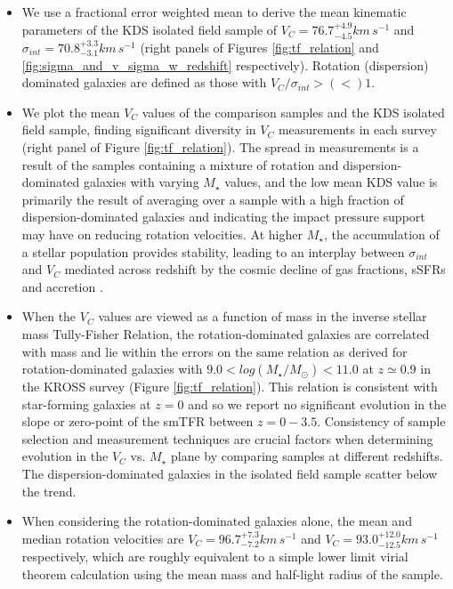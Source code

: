 \documentclass[fleqn,usenatbib]{mnras}
\begin{document}
\begin{itemize}
    \item We use a fractional error weighted mean to derive the mean kinematic parameters of the KDS isolated field sample of $V_{C} = 76.7^{+4.9}_{-4.5}km\,s^{-1}$ and $\sigma_{int} = 70.8^{+3.3}_{-3.1} km\,s^{-1}$ (right panels of Figures \ref{fig:tf_relation} and \ref{fig:sigma_and_v_sigma_w_redshift} respectively).
    Rotation (dispersion) dominated galaxies are defined as those with $V_{C}/\sigma_{int} > (<) 1$.  
    \item We plot the mean $V_{C}$ values of the comparison samples and the KDS isolated field sample, finding significant diversity in $V_{C}$ measurements in each survey (right panel of Figure \ref{fig:tf_relation}).
    The spread in measurements is a result of the samples containing a mixture of rotation and dispersion-dominated galaxies with varying $M_{\star}$ values, and the low mean KDS value is primarily the result of averaging over a sample with a high fraction of dispersion-dominated galaxies and indicating the impact pressure support may have on reducing rotation velocities.
    At higher $M_{\star}$, the accumulation of a stellar population provides stability, leading to an interplay between $\sigma_{int}$ and $V_{C}$ mediated across redshift by the cosmic decline of gas fractions, sSFRs and accretion \citep[e.g.][]{Law2012b,Wisnioski2015}.
    \item When the $V_{C}$ values are viewed as a function of mass in the inverse stellar mass Tully-Fisher Relation, the rotation-dominated galaxies are correlated with mass and lie within the errors on the same relation as derived for rotation-dominated galaxies with $9.0 < log(M_{\star}/M_{\odot}) < 11.0$ at $z\simeq0.9$ in the KROSS survey (Figure \ref{fig:tf_relation}). %
    This relation is consistent with star-forming galaxies at $z=0$ and so we report no significant evolution in the slope or zero-point of the smTFR between $z=0-3.5$.
    Consistency of sample selection and measurement techniques are crucial factors when determining evolution in the $V_{C}$ vs. $M_{\star}$ plane by comparing samples at different redshifts.
    The dispersion-dominated galaxies in the isolated field sample scatter below the trend.
    \item When considering the rotation-dominated galaxies alone, the mean and median rotation velocities are $V_{C} = 96.7^{+7.3}_{-7.2}km\,s^{-1}$ and $V_{C} = 93.0^{+12.0}_{-12.5}km\,s^{-1}$ respectively, which are roughly equivalent to a simple lower limit virial theorem calculation using the mean mass and half-light radius of the sample.

\end{itemize}
\end{document}
